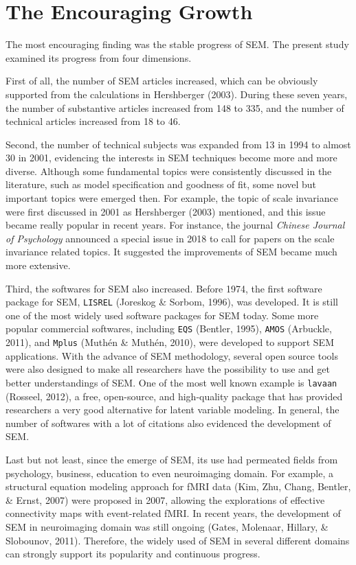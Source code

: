 \documentclass[jou]{apa6}
\theoremstyle{definition}
\theoremstyle{definition}
\theoremstyle{definition}
\theoremstyle{remark}
\begin{document}
\hypertarget{the-encouraging-growth}{%
\section{The Encouraging Growth}\label{the-encouraging-growth}}

The most encouraging finding was the stable progress of SEM. The present
study examined its progress from four dimensions.

\setlength{\parindent}{4ex}

First of all, the number of SEM articles increased, which can be
obviously supported from the calculations in Hershberger (2003). During
these seven years, the number of substantive articles increased from 148
to 335, and the number of technical articles increased from 18 to 46.

Second, the number of technical subjects was expanded from 13 in 1994 to
almost 30 in 2001, evidencing the interests in SEM techniques become
more and more diverse. Although some fundamental topics were
consistently discussed in the literature, such as model specification
and goodness of fit, some novel but important topics were emerged then.
For example, the topic of scale invariance were first discussed in 2001
as Hershberger (2003) mentioned, and this issue became really popular in
recent years. For instance, the journal \emph{Chinese Journal of
Psychology} announced a special issue in 2018 to call for papers on the
scale invariance related topics. It suggested the improvements of SEM
became much more extensive.

Third, the softwares for SEM also increased. Before 1974, the first
software package for SEM, \texttt{LISREL} (Joreskog \& Sorbom, 1996),
was developed. It is still one of the most widely used software packages
for SEM today. Some more popular commercial softwares, including
\texttt{EQS} (Bentler, 1995), \texttt{AMOS} (Arbuckle, 2011), and
\texttt{Mplus} (Muthén \& Muthén, 2010), were developed to support SEM
applications. With the advance of SEM methodology, several open source
tools were also designed to make all researchers have the possibility to
use and get better understandings of SEM. One of the most well known
example is \texttt{lavaan} (Rosseel, 2012), a free, open-source, and
high-quality package that has provided researchers a very good
alternative for latent variable modeling. In general, the number of
softwares with a lot of citations also evidenced the development of SEM.

Last but not least, since the emerge of SEM, its use had permeated
fields from psychology, business, education to even neuroimaging domain.
For example, a structural equation modeling approach for fMRI data (Kim,
Zhu, Chang, Bentler, \& Ernst, 2007) were proposed in 2007, allowing the
explorations of effective connectivity maps with event-related fMRI. In
recent years, the development of SEM in neuroimaging domain was still
ongoing (Gates, Molenaar, Hillary, \& Slobounov, 2011). Therefore, the
widely used of SEM in several different domains can strongly support its
popularity and continuous progress.
\end{document}
